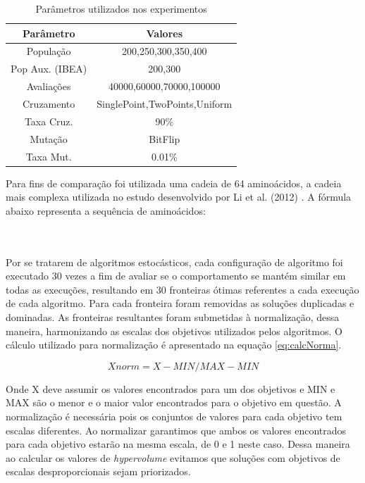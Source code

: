 \documentclass[conference]{IEEEtran}
\begin{document}
\begin{table}[h]
	\centering
	\caption{Parâmetros utilizados nos experimentos}
	\label{tab:tuning}
	\begin{tabular}{|c|c|}
		\hline
		{\bf Parâmetro} & {\bf Valores}                 \\ \hline
		População       & 200,250,300,350,400           \\
		\hline
		Pop Aux. (IBEA)        & 200,300                       \\ \hline
		Avaliações      & 40000,60000,70000,100000      \\ \hline
		Cruzamento      & SinglePoint,TwoPoints,Uniform \\ \hline
		Taxa Cruz.      & 90\%                          \\ \hline
		Mutação         & BitFlip                       \\ \hline
		Taxa Mut.       & 0.01\%                        \\ \hline
	\end{tabular}
\end{table}

Para fins de comparação foi utilizada uma cadeia de 64 aminoácidos, a cadeia mais complexa utilizada no estudo desenvolvido por Li et al. (2012) \cite{li2012genetic}. A fórmula abaixo representa a sequência de aminoácidos:  
\\
\\
\begin{small}
	\noindent {} 
\end{small}
\\

Por se tratarem de algoritmos estocásticos, cada configuração de algoritmo foi executado 30 vezes a fim de avaliar se o comportamento se mantém similar em todas as execuções, resultando em 30 fronteiras ótimas referentes a cada execução de cada algoritmo. 
Para cada fronteira foram removidas as soluções duplicadas e dominadas. As fronteiras resultantes foram submetidas à normalização, dessa maneira, harmonizando as escalas dos objetivos utilizados pelos algoritmos. O cálculo utilizado para normalização é apresentado na equação \ref{eq:calcNorma}.

\begin{equation}
\
Xnorm = X -MIN/ MAX -MIN\
\label{eq:calcNorma}
\end{equation}


Onde X deve assumir os valores encontrados para um dos objetivos e MIN e MAX são o menor e o maior valor encontrados para o objetivo em questão. 
A normalização é necessária pois os conjuntos de valores para cada objetivo tem escalas diferentes. Ao normalizar garantimos que ambos os valores encontrados para cada objetivo estarão na mesma escala, de 0 e 1 neste caso. Dessa maneira ao calcular os valores de \textit{hypervolume} evitamos que soluções com objetivos de escalas desproporcionais sejam priorizados.
\end{document}
